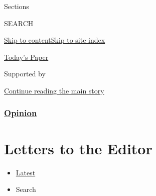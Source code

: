Sections

SEARCH

\protect\hyperlink{site-content}{Skip to
content}\protect\hyperlink{site-index}{Skip to site index}

\href{https://myaccount.nytimes.com/auth/login?response_type=cookie\&client_id=vi}{}

\href{https://www.nytimes.com/section/todayspaper}{Today's Paper}

Supported by

\protect\hyperlink{after-sponsor}{Continue reading the main story}

\hypertarget{opinion}{%
\subsubsection{\texorpdfstring{\href{/section/opinion}{Opinion}}{Opinion}}\label{opinion}}

\hypertarget{letters-to-the-editor}{%
\section{Letters to the Editor}\label{letters-to-the-editor}}

\begin{itemize}
\tightlist
\item
  \protect\hyperlink{stream-panel}{Latest}
\item
  Search
\end{itemize}

